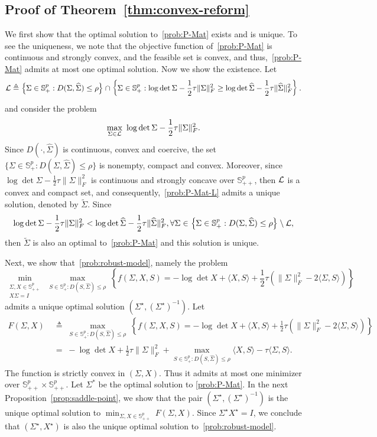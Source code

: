 \documentclass[11pt]{article}
\def\S{\mathbb{S}}
\def\la{\langle}
\def\PSD{{\S^k_{++}}}
\def\ra{\rangle}
\newcommand{\opt}{^\star}
\newcommand{\Let}{\triangleq}
\def\S{\mathbb{S}}
\def\la{\langle}
\def\PSD{{\S^p_{+}}}
\def\PD{{\S^p_{++}}}
\def\ra{\rangle}
\newcommand{\wh}{\widehat}
\begin{document}
\subsection{Proof of Theorem~\ref{thm:convex-reform}}
We first show that the optimal solution to~\eqref{prob:P-Mat} exists and is unique. To see the uniqueness, we note that the objective function of~\eqref{prob:P-Mat} is continuous and strongly convex, and the feasible set is convex, and thus,~\eqref{prob:P-Mat} admits at most one optimal solution. Now we show the existence. Let 
\[
    {\cal L} \Let \left\{\Sigma\in \PSD: D(\Sigma, \widehat{\Sigma})\leq  \rho\right\}\cap \left\{\Sigma\in \PSD:\log\det \Sigma - \frac{1}{2}\tau \|\Sigma\|_F^2 \geq \log\det \wh\Sigma - \frac{1}{2}\tau \|\wh\Sigma\|_F^2 \right\}.
\]
and consider the problem
\begin{align}\label{prob:P-Mat-L}
    \max_{\Sigma\in {\cal L}}~\log\det \Sigma - \frac{1}{2}\tau \|\Sigma\|_F^2.
\end{align}
Since $D(\cdot,\wh\Sigma)$ is continuous, convex and coercive, %
the set $\{\Sigma\in \PSD: D(\Sigma,\wh\Sigma)\leq \rho\}$ is nonempty, compact and convex. 
Moreover, 
since $\log\det \Sigma - \frac{1}{2}\tau \|\Sigma\|_F^2$ is continuous and strongly concave over $\PD$, 
then ${\cal L}$ is a convex and compact set, and consequently,~\eqref{prob:P-Mat-L}
admits a unique solution, denoted by $\widetilde{\Sigma}$. Since
\[
    \log\det \Sigma - \frac{1}{2}\tau \|\Sigma\|_F^2 <\log\det \wh\Sigma - \frac{1}{2}\tau \|\wh\Sigma\|_F^2, \forall \Sigma\in \left\{ \Sigma\in \PSD: D(\Sigma, \widehat{\Sigma})\leq  \rho\right\}\setminus {\cal L},
\]
then $\widetilde{\Sigma}$ is also an optimal to~\eqref{prob:P-Mat} and this solution is unique.  

Next, we show that~\eqref{prob:robust-model}, namely the problem
\[
\min_{\substack{\Sigma,X \in \PD \\ X \Sigma = I}} ~\max\limits_{S \in \PSD: D(S, \widehat{\Sigma})\leq  \rho}~\left\{ f(\Sigma, X, S) = -\log\det X+\la X,S\ra +\frac{1}{2}\tau \left(\|\Sigma\|_F^2-2\la \Sigma, S\ra\right) \right\}
\]
admits a unique optimal solution $(\Sigma\opt, (\Sigma\opt)^{-1})$. Let 
\begin{align*}
    F(\Sigma,X) &\;\Let\; \max\limits_{S \in \PSD: D(S, \widehat{\Sigma})\leq  \rho}~\left\{ f(\Sigma, X, S) = -\log\det X+\la X,S\ra +\frac{1}{2}\tau \left(\|\Sigma\|_F^2-2\la \Sigma, S\ra\right) \right\}\\
    &\;=\; -\log\det X + \frac{1}{2}\tau\|\Sigma\|_F^2 + \max\limits_{S \in \PSD: D(S, \widehat{\Sigma})\leq  \rho} \la X, S\ra - \tau \la \Sigma,S\ra.
\end{align*}
The function is strictly convex in $(\Sigma,X)$. Thus it admits at most one minimizer over $\PD\times \PD$. Let $\Sigma^*$ be the optimal solution to 
\eqref{prob:P-Mat}.
In the next Proposition~\ref{prop:saddle-point}, we
show that the pair $(\Sigma\opt, (\Sigma\opt)^{-1})$ is the unique optimal solution to $\min_{{\Sigma,X \in \PD}}~F(\Sigma,X)$. Since $\Sigma\opt X\opt = I$, we conclude that $(\Sigma\opt, X\opt)$ is also the unique optimal solution to~\eqref{prob:robust-model}.
\end{document}

